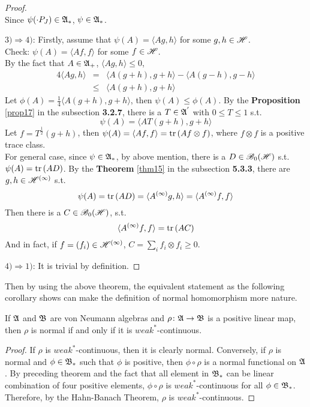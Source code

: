 \documentclass[a4paper,11pt]{report}
\begin{document}
\begin{proof}
\begin{equation*}
	\end{equation*}
	Since $\psi(\cdot P_J) \in \mathfrak{A}_*$, $\psi \in \mathfrak{A}_*$.
	\item $3) \Rightarrow 4)$: Firstly, assume that $\psi(A) = \langle Ag,h \rangle$ for some $g,h \in \mathscr{H}$. \\
	Check: $\psi(A) = \langle Af, f \rangle$ for some $f \in \mathscr{H}$. \\
	By the fact that $A \in \mathfrak{A}_+$, $\langle Ag,h \rangle \leqslant 0$, 
	\begin{eqnarray*}
		4\langle Ag,h \rangle &=& \langle A(g+h),g+h \rangle - \langle A(g-h),g-h \rangle \\
		&\leqslant& \langle A(g+h),g+h \rangle
	\end{eqnarray*}
	Let $\phi(A) = \frac{1}{4}\langle A(g+h),g+h \rangle$, then $\psi(A) \leqslant \phi(A)$. By the \textbf{Proposition} \ref{prop17} in the subsection \textbf{3.2.7}, there is a $T \in \mathfrak{A}^{'}$ with $0 \leqslant T \leqslant 1$ s.t. 
	\begin{equation*}
		\psi(A) =  \langle AT(g+h),g+h \rangle
	\end{equation*}
	Let $f = T^{\frac{1}{2}}(g+h)$, then $\psi(A) = \langle Af, f \rangle =  \operatorname{tr}{(Af \otimes f)}$, where $f \otimes f$ is a positive trace class. \\
	For general case, since $\psi \in \mathfrak{A}_*$, by above mention, there is a $D \in \mathscr{B}_{0}\mathscr{(H)}$ s.t. $\psi(A) = \operatorname{tr}{(AD)}$. By the \textbf{Theorem} \ref{thm15} in the subsection \textbf{5.3.3}, there are $g, h \in \mathscr{H}^{(\infty)}$  s.t.
	\begin{equation*}
		\psi(A)  = \operatorname{tr}{(AD)} = \langle A^{(\infty)}g,h \rangle = \langle A^{(\infty)}f,f \rangle
	\end{equation*} 
	Then there is a $C \in \mathscr{B}_{0}\mathscr{(H)}$, s.t.
	\begin{equation*}
		\langle A^{(\infty)}f,f \rangle = \operatorname{tr}{(AC)}
	\end{equation*}
	And in fact, if $f = (f_i) \in \mathscr{H}^{(\infty)}$, $C = \sum_i f_i \otimes f_i \geqslant 0$.
	\item $4) \Rightarrow 1)$: It is trivial by definition.
\end{proof}

Then by using the above theorem, the equivalent statement as the following corollary shows can make the definition of normal homomorphism more nature.

\begin{cor}
	If $\mathfrak{A}$ and $\mathfrak{B}$ are von Neumann algebras and $\rho \colon \mathfrak{A} \rightarrow \mathfrak{B}$ is a positive linear map, then $\rho$ is normal if and only if it is $weak^*$-continuous. 
\end{cor}
\begin{proof}
	If $\rho$ is $weak^*$-continuous, then it is clearly normal. Conversely, if $\rho$ is normal and $\phi \in \mathfrak{B}_*$ such that $\phi$ is positive, then $\phi \circ  \rho$ is a normal functional on $\mathfrak{A}$. By preceding theorem and the fact that all element in $\mathfrak{B}_*$ can be linear combination of four positive elements, $\phi \circ  \rho$ is $weak^*$-continuous for all $\phi \in \mathfrak{B}_*$. Therefore, by the Hahn-Banach Theorem, $\rho$ is $weak^*$-continuous.
\end{proof}
\end{document}
